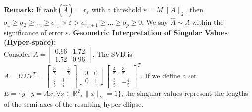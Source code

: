 \documentclass[12pt, a4paper]{article}
\theoremstyle{break}
\begin{document}
\noindent \textbf{Remark:} If $\text{rank}(\hat{A}) = r_\varepsilon$ with a threshold $\varepsilon = M \|A\|_2$, then $\sigma_1 \ge \sigma_2 \ge \dots \ge \sigma_{r_\varepsilon} > \varepsilon > \sigma_{r_\varepsilon+1} \ge \dots \ge \sigma_p \ge 0$.
We say $\hat{A} \sim A$ within the significance of error $\varepsilon$.
\vspace{0.3cm}
\noindent \textbf{Geometric Interpretation of Singular Values (Hyper-space):} \\
Consider $A = \begin{bmatrix} 0.96 & 1.72 \\ 1.72 & 0.96 \end{bmatrix}$.
The SVD is $A = U \Sigma V^T = \begin{bmatrix} \frac{3}{5} & -\frac{4}{5} \\ \frac{4}{5} & \frac{3}{5} \end{bmatrix} \begin{bmatrix} 3 & 0 \\ 0 & 1 \end{bmatrix} \begin{bmatrix} \frac{4}{5} & \frac{3}{5} \\ \frac{3}{5} & -\frac{4}{5} \end{bmatrix}^T$.
If we define a set $E = \{y \mid y = Ax, \forall x \in \mathbb{R}^2, \|x\|_2 = 1\}$, the singular values represent the lengths of the semi-axes of the resulting hyper-ellipse.
\end{document}
